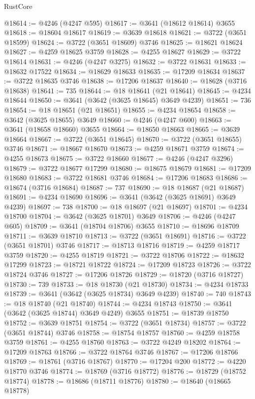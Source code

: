 \begin{lexlean}{RustCore}
\begin{coremodule}
@18614 := @4246 (@4247 @595)
@18617 := @3641 (@18612 @18614) @3655
@18618 := @18604 @18617
@18619 := @3639 @18618
@18621 := @3722 (@3651 @18599)
@18624 := @3722 (@3651 @18609) @3746
@18625 := @18621 @18624
@18627 := @4259 @18625 @3759
@18628 := @4255 @18627
@18629 := @3722 @18614
@18631 := @4246 (@4247 @3275)
@18632 := @3722 @18631
@18633 := @18632 @17522
@18634 := @18629 @18633
@18635 := @17209 @18634
@18637 := @3722 @18635 @3746
@18638 := @17206 @18637
@18640 := @18628 (@3716 @18638)
@18641 := 735
@18644 := @18 @18641 (@21 @18641)
@18645 := @4234 @18644
@18650 := @3641 (@3642 (@3625 @18645) @3649 @4239)
@18651 := 736
@18654 := @18 @18651 (@21 @18651)
@18655 := @4234 @18654
@18658 := @3642 (@3625 @18655) @3649
@18660 := @4246 (@4247 @600)
@18663 := @3641 (@18658 @18660) @3655
@18664 := @18650 @18663
@18665 := @3639 @18664
@18667 := @3722 (@3651 @18645)
@18670 := @3722 (@3651 @18655) @3746
@18671 := @18667 @18670
@18673 := @4259 @18671 @3759
@18674 := @4255 @18673
@18675 := @3722 @18660
@18677 := @4246 (@4247 @3296)
@18679 := @3722 @18677 @17299
@18680 := @18675 @18679
@18681 := @17209 @18680
@18683 := @3722 @18681 @3746
@18684 := @17206 @18683
@18686 := @18674 (@3716 @18684)
@18687 := 737
@18690 := @18 @18687 (@21 @18687)
@18691 := @4234 @18690
@18696 := @3641 (@3642 (@3625 @18691) @3649 @4239)
@18697 := 738
@18700 := @18 @18697 (@21 @18697)
@18701 := @4234 @18700
@18704 := @3642 (@3625 @18701) @3649
@18706 := @4246 (@4247 @605)
@18709 := @3641 (@18704 @18706) @3655
@18710 := @18696 @18709
@18711 := @3639 @18710
@18713 := @3722 (@3651 @18691)
@18716 := @3722 (@3651 @18701) @3746
@18717 := @18713 @18716
@18719 := @4259 @18717 @3759
@18720 := @4255 @18719
@18721 := @3722 @18706
@18722 := @18632 @17299
@18723 := @18721 @18722
@18724 := @17209 @18723
@18726 := @3722 @18724 @3746
@18727 := @17206 @18726
@18729 := @18720 (@3716 @18727)
@18730 := 739
@18733 := @18 @18730 (@21 @18730)
@18734 := @4234 @18733
@18739 := @3641 (@3642 (@3625 @18734) @3649 @4239)
@18740 := 740
@18743 := @18 @18740 (@21 @18740)
@18744 := @4234 @18743
@18750 := @3641 (@3642 (@3625 @18744) @3649 @4249) @3655
@18751 := @18739 @18750
@18752 := @3639 @18751
@18754 := @3722 (@3651 @18734)
@18757 := @3722 (@3651 @18744) @3746
@18758 := @18754 @18757
@18760 := @4259 @18758 @3759
@18761 := @4255 @18760
@18763 := @3722 @4249 @18202
@18764 := @17209 @18763
@18766 := @3722 @18764 @3746
@18767 := @17206 @18766
@18769 := @18761 (@3716 @18767)
@18770 := @17204 @200
@18772 := @4220 @18770 @3746
@18774 := @18769 (@3716 @18772)
@18776 := @18729 (@18752 @18774)
@18778 := @18686 (@18711 @18776)
@18780 := @18640 (@18665 @18778)

\end{coremodule}
\end{lexlean}

